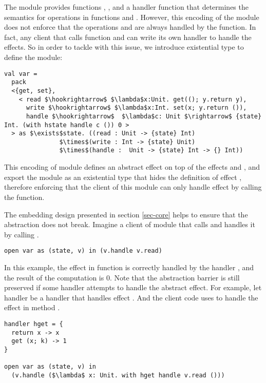 The module provides functions , , and a handler function  that determines the semantics for operations in functions  and . However, this encoding of the module  does not enforce that the operations  and  are always handled by the  function. In fact, any client that calls function  and  can write its own handler to handle the effects. So in order to tackle with this issue, we introduce existential type to define the module:
\begin{lstlisting}[mathescape=true]
val var = 
  pack 
  <{get, set}, 
    < read $\hookrightarrow$ $\lambda$x:Unit. get((); y.return y),
      write $\hookrightarrow$ $\lambda$x:Int. set(x; y.return ()),
      handle $\hookrightarrow$  $\lambda$c: Unit $\rightarrow$ {state} Int. (with hstate handle c ()) 0 >
  > as $\exists$state. ((read : Unit -> {state} Int) 
               $\times$(write : Int -> {state} Unit) 
               $\times$(handle :  Unit -> {state} Int -> {} Int))
\end{lstlisting}
This encoding of module defines an abstract effect  on top of the effects  and , and export the module as an existential type that hides the definition of effect , therefore enforcing that the client of this module can only handle effect  by calling the  function. 

The embedding design presented in section \ref{sec-core} helps to ensure that the abstraction does not break. Imagine a client of module  that calls  and handles it by calling . 

\begin{lstlisting}[mathescape=true]
open var as (state, v) in (v.handle v.read)
\end{lstlisting}

In this example, the  effect in function  is correctly handled by the handler , and the result of the computation is 0. Note that the abstraction barrier is still preserved if some handler attempts to handle the abstract effect. For example, let handler  be a handler that handles effect . And the client code uses  to handle the effect in method . 

\begin{lstlisting}[mathescape=true]
handler hget = {
  return x -> x
  get (x; k) -> 1
}

open var as (state, v) in 
  (v.handle ($\lambda$ x: Unit. with hget handle v.read ()))
\end{lstlisting}

